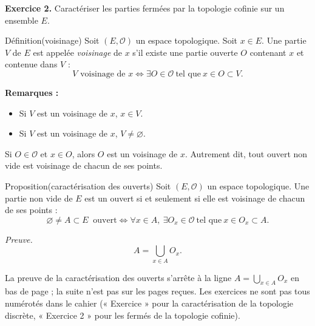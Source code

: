 \documentclass[11pt,a4paper]{article}
\newcommand{\Oo}{\mathscr{O}}
\begin{document}
\textbf{\color{bleu}Exercice 2.} Caractériser les parties fermées par la topologie cofinie sur un ensemble $E$.

\begin{enonce}{Définition}{(voisinage)}
Soit $(E,\Oo)$ un espace topologique. Soit $x\in E$. Une partie $V$ de $E$ est appelée \emph{voisinage} de $x$ s'il existe une partie ouverte $O$ contenant $x$ et contenue dans $V$ :
\[
  V\text{ voisinage de }x\iff\exists O\in\Oo\ \text{tel que}\ x\in O\subset V .
\]
\end{enonce}

\textbf{Remarques :}
\begin{itemize}
  \item Si $V$ est un voisinage de $x$, $x\in V$.
  \item Si $V$ est un voisinage de $x$, $V\neq\varnothing$.
\end{itemize}
Si $O\in\Oo$ et $x\in O$, alors $O$ est un voisinage de $x$. Autrement dit, tout ouvert non vide est voisinage de chacun de ses points.

\begin{enonce}{Proposition}{(caractérisation des ouverts)}
Soit $(E,\Oo)$ un espace topologique. Une partie non vide de $E$ est un ouvert si et seulement si elle est voisinage de chacun de ses points :
\[
  \varnothing\neq A\subset E\ \text{ ouvert}\iff\forall x\in A,\ \exists O_x\in\Oo\ \text{tel que}\ x\in O_x\subset A .
\]
\end{enonce}

\textit{Preuve.}
\[
  A=\bigcup_{x\in A}O_x .
\]

\begin{note}
La preuve de la caractérisation des ouverts s'arrête à la ligne $A=\bigcup_{x\in A}O_x$ en bas de page ; la suite n'est pas sur les pages reçues.
Les exercices ne sont pas tous numérotés dans le cahier (« Exercice » pour la caractérisation de la topologie discrète, « Exercice 2 » pour les fermés de la topologie cofinie).
\end{note}
\end{document}
